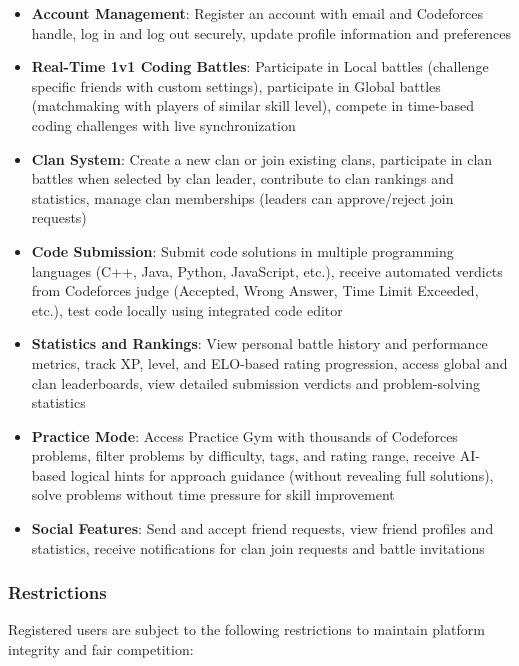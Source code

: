 \documentclass[12pt,a4paper]{article}
\begin{document}
\begin{itemize}[leftmargin=*]
\item \textbf{Account Management}: Register an account with email and Codeforces handle, log in and log out securely, update profile information and preferences
\item \textbf{Real-Time 1v1 Coding Battles}: Participate in Local battles (challenge specific friends with custom settings), participate in Global battles (matchmaking with players of similar skill level), compete in time-based coding challenges with live synchronization
\item \textbf{Clan System}: Create a new clan or join existing clans, participate in clan battles when selected by clan leader, contribute to clan rankings and statistics, manage clan memberships (leaders can approve/reject join requests)
\item \textbf{Code Submission}: Submit code solutions in multiple programming languages (C++, Java, Python, JavaScript, etc.), receive automated verdicts from Codeforces judge (Accepted, Wrong Answer, Time Limit Exceeded, etc.), test code locally using integrated code editor
\item \textbf{Statistics and Rankings}: View personal battle history and performance metrics, track XP, level, and ELO-based rating progression, access global and clan leaderboards, view detailed submission verdicts and problem-solving statistics
\item \textbf{Practice Mode}: Access Practice Gym with thousands of Codeforces problems, filter problems by difficulty, tags, and rating range, receive AI-based logical hints for approach guidance (without revealing full solutions), solve problems without time pressure for skill improvement
\item \textbf{Social Features}: Send and accept friend requests, view friend profiles and statistics, receive notifications for clan join requests and battle invitations
\end{itemize}

\subsubsection{Restrictions}

Registered users are subject to the following restrictions to maintain platform integrity and fair competition:
\end{document}
